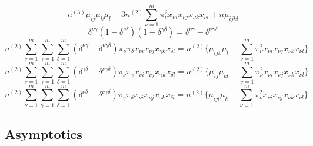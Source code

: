 \documentclass[
  12pt,
  letterpaper,
  DIV=11,
  numbers=noendperiod]{scrartcl}
\begin{document}
\[
n^{(3)}\mu_{ij}\mu_k\mu_l+3n^{(2)}\sum_{\nu=1}^m\pi_\nu^2x_{\nu i}x_{\nu j}x_{\nu k}x_{\nu l}+n\mu_{ijkl}
\] \[
\delta^{\nu\gamma}(1-\delta^{\nu\delta})(1-\delta^{\gamma\delta})=\delta^{\nu\gamma}-\delta^{\nu\gamma\delta}\]
\[
n^{(2)}\sum_{\nu=1}^m\sum_{\gamma=1}^m\sum_{\delta=1}^m(\delta^{\nu\gamma}-\delta^{\nu\gamma\delta})\pi_\nu\pi_\delta x_{\nu i}x_{\nu j}x_{\gamma k}x_{\delta l}=n^{(2)}\{\mu_{ijk}\mu_l-\sum_{\nu=1}^m\pi_\nu^2x_{\nu i}x_{\nu j}x_{\nu k}x_{\nu l}\}
\] \[
n^{(2)}\sum_{\nu=1}^m\sum_{\gamma=1}^m\sum_{\delta=1}^m(\delta^{\gamma\delta}-\delta^{\nu\gamma\delta})\pi_\nu\pi_\gamma x_{\nu i}x_{\nu j}x_{\gamma k}x_{\delta l}=n^{(2)}\{\mu_{ij}\mu_{kl}-\sum_{\nu=1}^m\pi_\nu^2x_{\nu i}x_{\nu j}x_{\nu k}x_{\nu l}\}
\] \[
n^{(2)}\sum_{\nu=1}^m\sum_{\gamma=1}^m\sum_{\delta=1}^m(\delta^{\nu\delta}-\delta^{\nu\gamma\delta})\pi_\gamma\pi_\delta x_{\nu i}x_{\nu j}x_{\gamma k}x_{\delta l}=n^{(2)}\{\mu_{ijl}\mu_k-\sum_{\nu=1}^m\pi_\nu^2x_{\nu i}x_{\nu j}x_{\nu k}x_{\nu l}\}
\]

\subsection{Asymptotics}\label{asymptotics}
\end{document}
